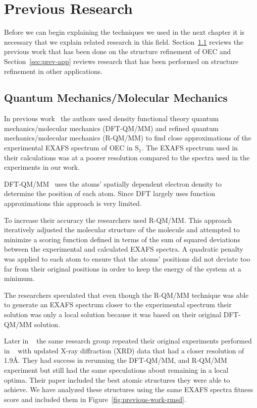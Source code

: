 \chapter{Previous Research}

Before we can begin explaining the techniques we used in the next chapter it is necessary that we explain related research in this field. Section~\ref{sec:prev-work} reviews the previous work that has been done on the structure refinement of OEC and Section~\ref{sec:prev-app} reviews research that has been performed on structure refinement in other applications.

\section{Quantum Mechanics/Molecular Mechanics}
\label{sec:prev-work}

In previous work~\cite{sproviero2008model} the authors used density functional theory quantum mechanics/molecular mechanics (DFT-QM/MM) and refined quantum mechanics/molecular mechanics (R-QM/MM) to find close approximations of the experimental EXAFS spectrum of OEC in S$_{1}$. The EXAFS spectrum used in their calculations was at a poorer resolution compared to the spectra used in the experiments in our work.

DFT-QM/MM~\cite{parr1989density} uses the atoms' spatially dependent electron density to determine the position of each atom. Since DFT largely uses function approximations this approach is very limited.

To increase their accuracy the researchers used R-QM/MM. This approach iteratively adjusted the molecular structure of the molecule and attempted to minimize a scoring function defined in terms of the sum of squared deviations between the experimental and calculated EXAFS spectra. A quadratic penalty was applied to each atom to ensure that the atoms' positions did not deviate too far from their original positions in order to keep the energy of the system at a minimum.

The researchers speculated that even though the R-QM/MM technique was able to generate an EXAFS spectrum closer to the experimental spectrum their solution was only a local solution because it was based on their original DFT-QM/MM solution.

Later in ~\cite{luber2011s1} the same research group repeated their original experiments performed in ~\cite{sproviero2008model} with updated X-ray diffraction (XRD) data that had a closer resolution of 1.9\AA. They had success in rerunning the DFT-QM/MM, and R-QM/MM experiment but still had the same speculations about remaining in a local optima. Their paper included the best atomic structures they were able to achieve. We have analyzed these structures using the same EXAFS spectra fitness score and included them in Figure~\ref{fig:previous-work-rmsd}.

